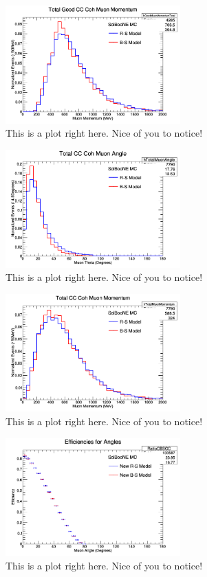 \documentclass[11pt]{article}
\begin{document}
\begin{figure}[H]
\centering
\includegraphics[width=0.6\textwidth]{ANMCombinedPlotsImages/12-ANMCombinedPlots.png}
\caption{This is a plot right here. Nice of you to notice!}
\end{figure}

\begin{figure}[H]
\centering
\includegraphics[width=0.6\textwidth]{ANMCombinedPlotsImages/13-ANMCombinedPlots.png}
\caption{This is a plot right here. Nice of you to notice!}
\end{figure}

\begin{figure}[H]
\centering
\includegraphics[width=0.6\textwidth]{ANMCombinedPlotsImages/14-ANMCombinedPlots.png}
\caption{This is a plot right here. Nice of you to notice!}
\end{figure}

\begin{figure}[H]
\centering
\includegraphics[width=0.6\textwidth]{ANMCombinedPlotsImages/15-ANMCombinedPlots.png}
\caption{This is a plot right here. Nice of you to notice!}
\end{figure}
\end{document}
